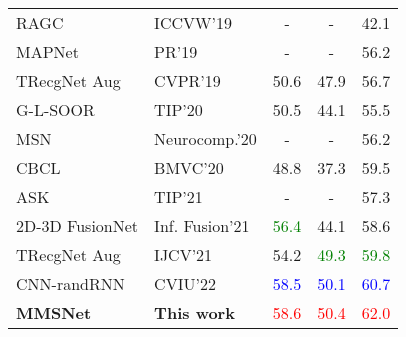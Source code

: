 \begin{table}[!t]
\begin{center}
\begin{adjustbox}{width=\columnwidth}
\begin{tabular}{ llccc }
				RAGC \citep{2019_ICCVW_Montoro} 					& ICCVW'19			& - 	           	& - 	        	& 42.1 		\\ 
				MAPNet \citep{2019_PR_Li} 							& PR'19				& - 	           	& - 	        	& 56.2 		\\ 
				TRecgNet Aug \citep{2019_CVPR_Du}         			& CVPR'19			& 50.6 				& 47.9 				& 56.7 		\\
				G-L-SOOR \citep{2020_TIP_Song}         				& TIP'20			& 50.5 	           	& 44.1 	        	& 55.5		\\
				MSN \citep{2020_Neuroc_Xiong}         				& Neurocomp.'20		& - 	           	& - 	        	& 56.2		\\
				CBCL \citep{2020_BMVC_Ayub}         				& BMVC'20			& 48.8 				& 37.3 	        	& 59.5 		\\ 
				ASK \citep{2021_TIP_Xiong}  						& TIP'21			& - 				& -	        		& 57.3 		\\
				2D-3D FusionNet \citep{2021_IF_Montoro}  			& Inf. Fusion'21	& \bftab\textcolor{green}{56.4} 		& 44.1	        	& 58.6 		\\
				TRecgNet Aug \citep{2021_IJCV_Du}  					& IJCV'21			& 54.2 				& \bftab\textcolor{green}{49.3} 	        	& \bftab\textcolor{green}{59.8} 		\\
				CNN-randRNN \citep{2022_CVIU_Caglayan}   			& CVIU'22			& \bftab\textcolor{blue}{58.5} 				& \bftab\textcolor{blue}{50.1} 				& \bftab\textcolor{blue}{60.7} 		\\ \hline
				\textbf{MMSNet}  									& \textbf{This work	}		& \bftab\textcolor{red}{58.6}		& \bftab\textcolor{red}{50.4}  	& \bftab\textcolor{red}{62.0} 	\\ %
				\hline
			\end{tabular}
		\end{adjustbox}
		\label{table:sunrgbdResults}
	\end{center}
\end{table}
